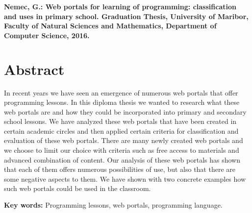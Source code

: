 \textbf{Nemec, G.: Web portals for learning of programming: classification and
  uses in primary school. Graduation Thesis, University of Maribor, Faculty of
  Natural Sciences and Mathematics, Department of Computer Science, 2016.}

\section*{Abstract}
\label{sec:abstract}

In recent years we have seen an emergence of numerous web portals that offer
programming lessons. In this diploma thesis we wanted to research what these web
portals are and how they could be incorporated into primary and secondary school
lessons. We have analyzed these web portals that have been created in certain
academic circles and then applied certain criteria for classification and
evaluation of these web portals. There are many newly created web portals and we
choose to limit our choice with criteria such as free access to materials and
advanced combination of content. Our analysis of these web portals has shown
that each of them offers numerous possibilities of use, but also that there are
some negative aspects to them. We have shown with two concrete examples how such
web portals could be used in the classroom.

\textbf{Key words:} Programming lessons, web portals, programming language.

